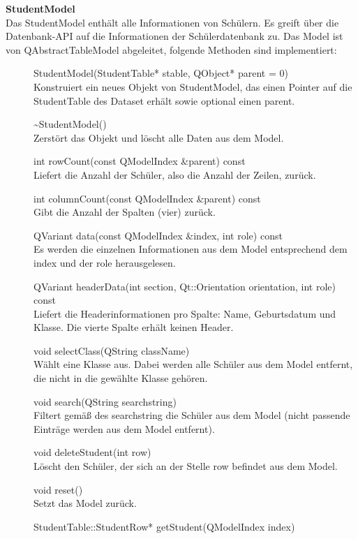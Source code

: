 \textbf{StudentModel}\\
Das StudentModel enthält alle Informationen von Schülern. Es greift über die Datenbank-API auf die Informationen der Schülerdatenbank zu. Das Model ist von QAbstractTableModel abgeleitet, folgende Methoden sind implementiert:
\begin{description}
	\item[ ] StudentModel(StudentTable* stable, QObject* parent = 0)\\
	Konstruiert ein neues Objekt von StudentModel, das einen Pointer auf die StudentTable des Dataset erhält sowie optional einen parent.
  \item[ ] \~{}StudentModel()\\
	Zerstört das Objekt und löscht alle Daten aus dem Model.
	\item[ ] int rowCount(const QModelIndex \&parent) const\\
	Liefert die Anzahl der Schüler, also die Anzahl der Zeilen, zurück.
  \item[ ] int columnCount(const QModelIndex \&parent) const\\
	Gibt die Anzahl der Spalten (vier) zurück.
  \item[ ] QVariant data(const QModelIndex \&index, int role) const\\
	Es werden die einzelnen Informationen aus dem Model entsprechend dem index und der role herausgelesen.
  \item[ ] QVariant headerData(int section, Qt::Orientation orientation, int role) const\\
	Liefert die Headerinformationen pro Spalte: Name, Geburtsdatum und Klasse. Die vierte Spalte erhält keinen Header.
  \item[ ] void selectClass(QString className)\\
	Wählt eine Klasse aus. Dabei werden alle Schüler aus dem Model entfernt, die nicht in die gewählte Klasse gehören.
  \item[ ] void search(QString searchstring)\\
	Filtert gemäß des searchstring die Schüler aus dem Model (nicht passende Einträge werden aus dem Model entfernt).
	\item[ ] void deleteStudent(int row)\\
	Löscht den Schüler, der sich an der Stelle row befindet aus dem Model.
  \item[ ] void reset()\\
	Setzt das Model zurück.
  \item[ ] StudentTable::StudentRow* getStudent(QModelIndex index)\\

\end{description}
